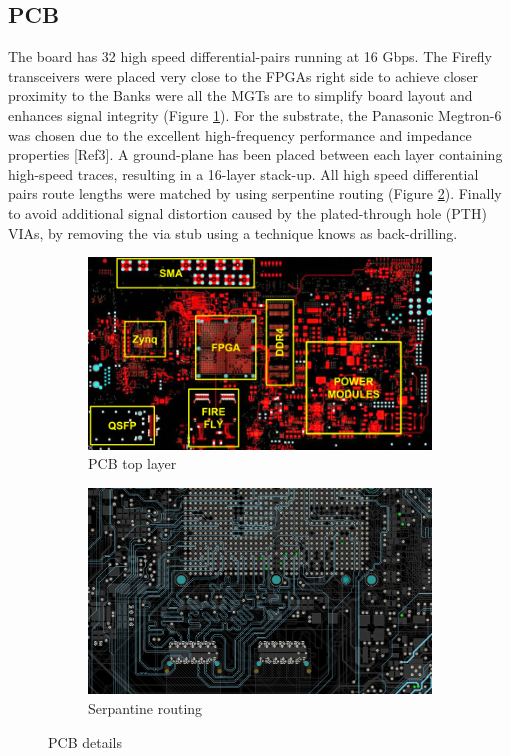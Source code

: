 \documentclass[a4paper]{PoS}
\begin{document}
\subsection{PCB}
The board has 32 high speed differential-pairs running at 16 Gbps. The Firefly transceivers were placed very close to the FPGAs right side to achieve closer proximity to the Banks  were all the MGTs are to simplify board layout and enhances signal integrity (Figure \ref{fig:toplayer}). For the substrate, the Panasonic Megtron-6 was chosen due to the excellent high-frequency performance and impedance properties [Ref3]. A ground-plane has been placed between each layer containing high-speed traces, resulting in a 16-layer stack-up. All high speed differential pairs route lengths were matched by using serpentine routing (Figure \ref{fig:serpantine}). Finally to avoid additional signal distortion caused by the plated-through hole (PTH) VIAs, by removing the via stub using a technique knows as back-drilling.


\begin{figure}
\begin{subfigure}{.5\textwidth}
  \centering
  \includegraphics[width=1\linewidth]{pcb.png}
  \caption{PCB top layer}
  \label{fig:toplayer}
\end{subfigure}%
\begin{subfigure}{.5\textwidth}
  \centering
  \includegraphics[width=0.9\linewidth]{serpentine_routing.png}
  \caption{Serpantine routing}
  \label{fig:serpantine}
\end{subfigure}
\caption{PCB details}
\label{fig:pcb}
\end{figure}
\end{document}
